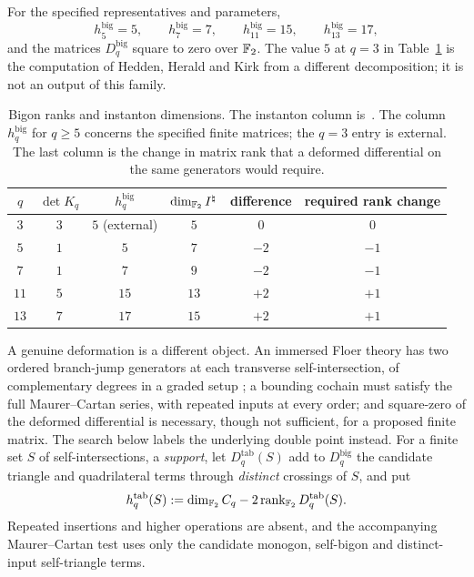 \begin{computation}\label{comp:law}
For the specified representatives and parameters,
\[
 h_5^{\mathrm{big}}=5,\qquad h_7^{\mathrm{big}}=7,\qquad
 h_{11}^{\mathrm{big}}=15,\qquad h_{13}^{\mathrm{big}}=17,
\]
and the matrices $D_q^{\mathrm{big}}$ square to zero over $\mathbb{F}_2$.  The value $5$ at $q=3$ in
Table~\ref{tab:family} is the computation of Hedden, Herald and Kirk \cite[\S11.6]{HHK2} from a
different decomposition; it is not an output of this family.
\end{computation}

\begin{table}[ht]
\centering
\small
\begin{tabular}{c|ccccc}
 $q$ & $\det K_q$ & $h_q^{\mathrm{big}}$ & $\dim_{\mathbb{F}_2}I^{\natural}$ & difference & required rank change \\ \hline
 $3$ & $3$ & $5$ (external) & $5$ & $0$ & $0$ \\
 $5$ & $1$ & $5$ & $7$ & $-2$ & $-1$ \\
 $7$ & $1$ & $7$ & $9$ & $-2$ & $-1$ \\
 $11$ & $5$ & $15$ & $13$ & $+2$ & $+1$ \\
 $13$ & $7$ & $17$ & $15$ & $+2$ & $+1$ \\
\end{tabular}
\medskip
\caption{Bigon ranks and instanton dimensions.  The instanton column is~\cite[Thm.~1.1]{WuebbenII}.  The
column $h_q^{\mathrm{big}}$ for $q\ge5$ concerns the specified finite matrices; the $q=3$ entry is
external.  The last column is the change in matrix rank that a deformed differential on the same
generators would require.}
\label{tab:family}
\end{table}

A genuine deformation is a different object.  An immersed Floer theory has two ordered branch-jump
generators at each transverse self-intersection, of complementary degrees in a graded setup
\cite{AkahoJoyce}; a bounding cochain must satisfy the full Maurer--Cartan series, with repeated inputs
at every order; and square-zero of the deformed differential is necessary, though not sufficient, for
a proposed finite matrix.  The search below labels the underlying double point instead.  For a finite
set $S$ of self-intersections, a \emph{support}, let $D_q^{\mathrm{tab}}(S)$ add to
$D_q^{\mathrm{big}}$ the candidate triangle and quadrilateral terms through \emph{distinct} crossings
of $S$, and put
\begin{equation}\label{eq:tab-stat}
 h_q^{\mathrm{tab}}(S):=\dim_{\mathbb{F}_2}C_q-2\operatorname{rank}_{\mathbb{F}_2}D_q^{\mathrm{tab}}(S).
\end{equation}
Repeated insertions and higher operations are absent, and the accompanying Maurer--Cartan test uses
only the candidate monogon, self-bigon and distinct-input self-triangle terms.

